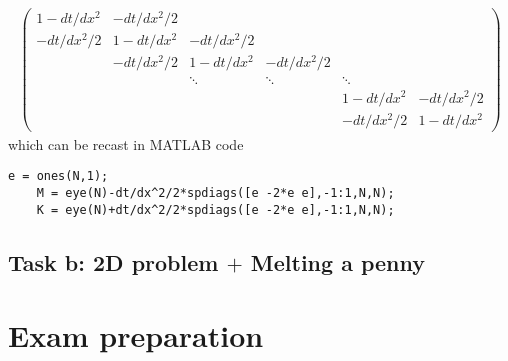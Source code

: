 \documentclass[12pt]{article}
\begin{document}
\begin{align}
	\begin{pmatrix}
		1-dt/dx^2  & -dt/dx^2/2 &            &            &            &            \\
		-dt/dx^2/2 & 1-dt/dx^2  & -dt/dx^2/2 &            &            &            \\
		           & -dt/dx^2/2 & 1-dt/dx^2  & -dt/dx^2/2 &            &            \\
		           &            & \ddots     & \ddots     & \ddots     &            \\
		           &            &            &            & 1-dt/dx^2  & -dt/dx^2/2 \\
		           &            &            &            & -dt/dx^2/2 & 1-dt/dx^2
	\end{pmatrix}
\end{align}
which can be recast in MATLAB code 
\begin{lstlisting}[caption = {Matrix M and K.}]
	e = ones(N,1);
	M = eye(N)-dt/dx^2/2*spdiags([e -2*e e],-1:1,N,N);
	K = eye(N)+dt/dx^2/2*spdiags([e -2*e e],-1:1,N,N);
\end{lstlisting}
\newpage
\subsection{Task b: 2D problem $+$ Melting a penny}
\newpage
\section{Exam preparation}


\end{document}
